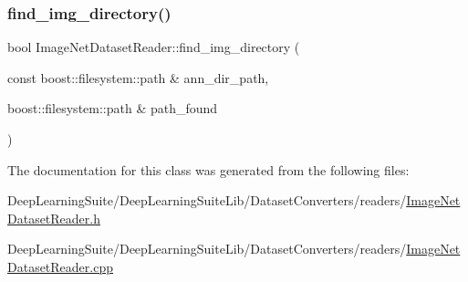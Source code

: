 \mbox{\label{class_image_net_dataset_reader_ac9bbb0c47493ea984681d51be2e04b45}} 
\subsubsection{\texorpdfstring{find\+\_\+img\+\_\+directory()}{find\_img\_directory()}}
{\footnotesize\ttfamily bool Image\+Net\+Dataset\+Reader\+::find\+\_\+img\+\_\+directory (\begin{DoxyParamCaption}\item[{const boost\+::filesystem\+::path \&}]{ann\+\_\+dir\+\_\+path,  }\item[{boost\+::filesystem\+::path \&}]{path\+\_\+found }\end{DoxyParamCaption})}



The documentation for this class was generated from the following files\+:\begin{DoxyCompactItemize}
\item 
Deep\+Learning\+Suite/\+Deep\+Learning\+Suite\+Lib/\+Dataset\+Converters/readers/\hyperlink{_image_net_dataset_reader_8h}{Image\+Net\+Dataset\+Reader.\+h}\item 
Deep\+Learning\+Suite/\+Deep\+Learning\+Suite\+Lib/\+Dataset\+Converters/readers/\hyperlink{_image_net_dataset_reader_8cpp}{Image\+Net\+Dataset\+Reader.\+cpp}\end{DoxyCompactItemize}

